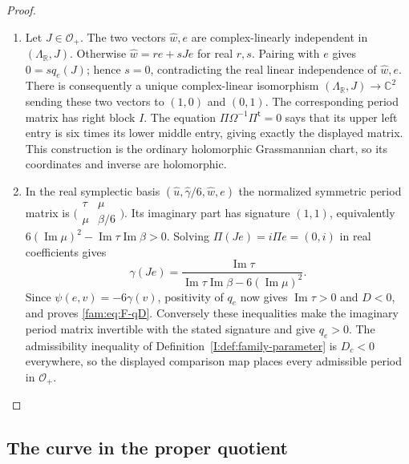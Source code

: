 \begin{proof}
\begin{enumerate}[label=\arabic*.,leftmargin=*]
\item Let $J\in\mathcal O_+$.  The two vectors $\widehat w,e$ are complex-linearly
independent in $(\Lambda_{\mathbb R},J)$.  Otherwise
$\widehat w=r e+sJe$ for real $r,s$.  Pairing with $e$ gives
$0=sq_e(J)$; hence $s=0$, contradicting the real linear independence
of $\widehat w,e$.  There is consequently a unique complex-linear
isomorphism $(\Lambda_{\mathbb R},J)\to\mathbb C^2$ sending these two
vectors to $(1,0)$ and $(0,1)$.  The corresponding period matrix has
right block $I$.  The equation
$\Pi\Omega^{-1}\Pi^{\mathsf t}=0$ says that its upper left entry is
six times its lower middle entry, giving exactly the displayed matrix.
This construction is the ordinary holomorphic Grassmannian chart,
so its coordinates and inverse are holomorphic.

\item In the real symplectic basis
$(\widehat u,\widehat\gamma/6,\widehat w,e)$ the normalized symmetric
period matrix is
$\bigl(\begin{smallmatrix}\tau&\mu\\\mu&\beta/6\end{smallmatrix}\bigr)$.
Its imaginary part has signature $(1,1)$, equivalently
$6(\operatorname{Im}\mu)^2-
\operatorname{Im}\tau\operatorname{Im}\beta>0$.
Solving $\Pi(Je)=i\Pi e=(0,i)$ in real coefficients gives
\[
 \gamma(Je)=
 \frac{\operatorname{Im}\tau}
 {\operatorname{Im}\tau\operatorname{Im}\beta-
 6(\operatorname{Im}\mu)^2}.
\]
Since $\psi(e,v)=-6\gamma(v)$, positivity of $q_e$ now gives
$\operatorname{Im}\tau>0$ and $D<0$, and proves \eqref{fam:eq:F-qD}.
Conversely these inequalities make the imaginary period matrix
invertible with the stated signature and give $q_e>0$.  The admissibility
inequality of Definition~\ref{I:def:family-parameter} is $D_c<0$
everywhere, so the displayed comparison map places every admissible
period in $\mathcal O_+$.
\end{enumerate}
\end{proof}

\subsection{The curve in the proper quotient}\hypertarget{tag-01PY}{}\label{fam:section:F.3}

